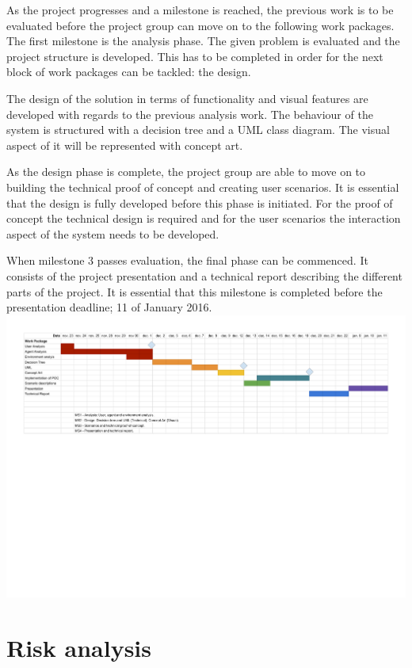 \documentclass[twoside]{report}
\begin{document}
As the project progresses and a milestone is reached, the previous work is to be
evaluated before the project group can move on to the following work
packages. The first milestone is the analysis phase. The given problem is
evaluated and the project structure is developed. This has to be completed in
order for the next block of work packages can be tackled: the design. 

The design of the solution in terms of functionality and visual features are
developed with regards to the previous analysis work. The behaviour of the
system is structured with a decision tree and a UML class diagram. The visual
aspect of it will be represented with concept art. 

As the design phase is complete, the project group are able to move on to
building the technical proof of concept and creating user scenarios. It is
essential that the design is fully developed before this phase is initiated. For
the proof of concept the technical design is required and for the user scenarios
the interaction aspect of the system needs to be developed. 

When milestone 3 passes evaluation, the final phase can be commenced. It
consists of the project presentation and a technical report describing the
different parts of the project. It is essential that this milestone is completed
before the presentation deadline; 11 of January 2016.
\includegraphics[scale=0.9]{graphics/gantt.pdf} 

\section{Risk analysis}
\end{document}
